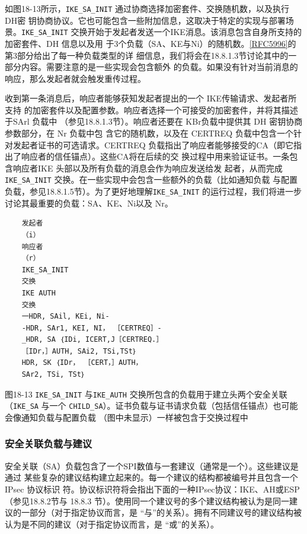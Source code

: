 如图18-13所示，\verb|IKE_SA_INIT| 通过协商选择加密套件、交换随机数，以及执行 DH密
钥协商协议。它也可能包含一些附加信息，这取决于特定的实现与部署场景。\verb|IKE_SA_INIT|
交换开始于发起者发送一个IKE消息。该消息包含自身所支持的加密套件、DH 信息以及用
于3个负载（SA、KE与Ni）的随机数。\href{https://www.rfc-editor.org/rfc/rfc5996}{[RFC5996]}的第3部分给出了每一种负载类型的详
细信息，我们将会在18.8.1.3节讨论其中的一部分内容。需要注意的是一些实现会包含额外
的负载。如果没有针对当前消息的响应，那么发起者就会触发重传过程。

收到第一条消息后，响应者能够获知发起者提出的一个 IKE传输请求、发起者所支持
的加密套件以及配置参数。响应者选择一个可接受的加密套件，并将其描述于SArl 负载中
（参见18.8.1.3节）。响应者还要在 KBr负载中提供其 DH 密钥协商参数部分，在 Nr 负载中包
含它的随机数，以及在 CERTREQ 负载中包含一个针对发起者证书的可选请求。CERTREQ
负载指出了响应者能够接受的CA（即它指出了响应者的信任锚点）。这些CA将在后续的交
换过程中用来验证证书。一条包含响应者IKE 头部以及所有负载的消息会作为响应发送给发
起者，从而完成\verb|IKE_SA_INIT| 交换。在一些实现中会包含一些额外的负载（比如通知负载
与配置负载，参见18.8.1.5节）。为了更好地理解\verb|IKE_SA_INIT| 的运行过程，我们将进一步
讨论其最重要的负载：SA、KE、Ni以及 Nr。

\begin{verbatim}
    发起者
    （i）
    响应者
    （r）
    IKE_SA_INIT
    交换
    IKE AUTH
    交换
    一HDR, SAil, KEi, Ni-
    -HDR, SAr1, KEI, NI， ［CERTREQ］-
    _HDR, SA ｛IDi, ICERT,J［CERTREQ.］
    ［IDr，］AUTH, SAi2, TSi,TSt｝
    HDR, SK ｛IDr， ［CERT，］AUTH，
    SAr2, TSi, TSt｝
\end{verbatim}
图18-13
\verb|IKE_SA_INIT| 与\verb|IKE_AUTH| 交换所包含的负载用于建立头两个安全关联（\verb|IKE_SA| 与一个
\verb|CHILD_SA|）。证书负载与证书请求负载（包括信任锚点）也可能会像通知负载与配置负载
（图中未显示）一样被包含于交换过程中

\subsubsection{安全关联负载与建议}
安全关联（SA）负载包含了一个SPI数值与一套建议（通常是一个）。这些建议是通过
某些复杂的建议结构建立起来的。每一个建议的结构都被编号并且包含一个 IPsec 协议标识
符。协议标识符将会指出下面的一种IPsec协议：IKE、AH或ESP（参见18.8.2节与 18.8.3
节）。使用同一个建议号的多个建议结构被认为是同一建议的一部分（对于指定协议而言，是
“与”的关系）。拥有不同建议号的建议结构被认为是不同的建议（对于指定协议而言，是
“或”的关系）。

